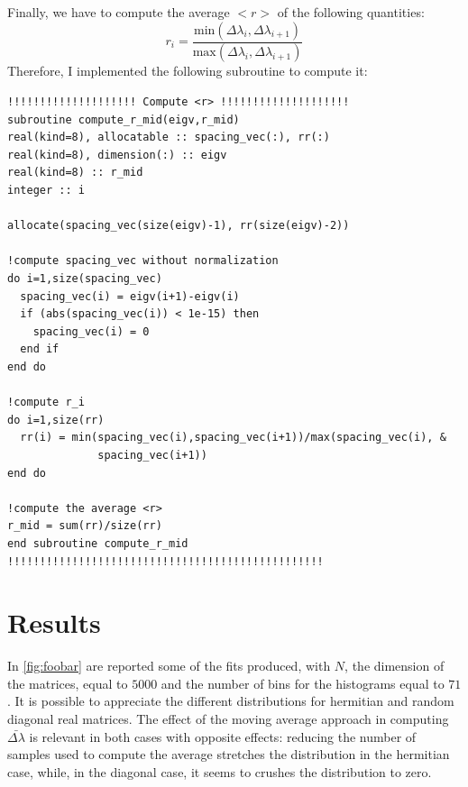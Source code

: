 \documentclass[prb,9pt,notitlepage]{revtex4-1}
\begin{document}
Finally, we have to compute the average $<r>$ of the following quantities:
\begin{equation}
  r_i = \frac{\mbox{min}(\Delta\lambda_i,\Delta\lambda_{i+1})}{\mbox{max}(\Delta\lambda_i,\Delta\lambda_{i+1})}
\end{equation}
Therefore, I implemented the following subroutine to compute it:
\begin{lstlisting}
!!!!!!!!!!!!!!!!!!!! Compute <r> !!!!!!!!!!!!!!!!!!!!
subroutine compute_r_mid(eigv,r_mid)
real(kind=8), allocatable :: spacing_vec(:), rr(:)
real(kind=8), dimension(:) :: eigv
real(kind=8) :: r_mid
integer :: i

allocate(spacing_vec(size(eigv)-1), rr(size(eigv)-2))

!compute spacing_vec without normalization
do i=1,size(spacing_vec)
  spacing_vec(i) = eigv(i+1)-eigv(i)
  if (abs(spacing_vec(i)) < 1e-15) then
    spacing_vec(i) = 0
  end if
end do

!compute r_i
do i=1,size(rr)
  rr(i) = min(spacing_vec(i),spacing_vec(i+1))/max(spacing_vec(i), &
              spacing_vec(i+1))
end do

!compute the average <r>
r_mid = sum(rr)/size(rr)
end subroutine compute_r_mid
!!!!!!!!!!!!!!!!!!!!!!!!!!!!!!!!!!!!!!!!!!!!!!!!!
\end{lstlisting}

\section{Results}
In \ref{fig:foobar} are reported some of the fits produced, with $N$, the dimension of the matrices, equal to $5000$ and the number of bins for the histograms equal to $71$. It is possible to appreciate the different distributions for hermitian and random diagonal real matrices. The effect of the moving average approach in computing $\bar{\Delta\lambda}$ is relevant in both cases with opposite effects: reducing the number of samples used to compute the average stretches the distribution in the hermitian case, while, in the diagonal case, it seems to crushes the distribution to zero.
\end{document}
